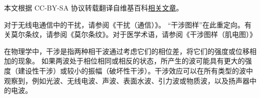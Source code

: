 
本文根据 CC-BY-SA 协议转载翻译自维基百科\href{https://en.wikipedia.org/wiki/Wave_interference}{相关文章}。

对于无线电通信中的干扰，请参阅《干扰（通信）》。
“干涉图样”在此重定向。有关莫尔条纹，请参阅《莫尔条纹》。对于医学术语，请参阅《干涉图样（肌电图）》

在物理学中，干涉是指两种相干波通过考虑它们的相位差，将它们的强度或位移相加的现象。 如果两波处于相位相同或相反的状态，所产生的波可能具有更大的强度（建设性干涉）或较小的振幅（破坏性干涉）。干涉效应可以在所有类型的波中观察到，例如光波、无线电波、声波、表面水波、引力波或物质波，以及扬声器中的电波。